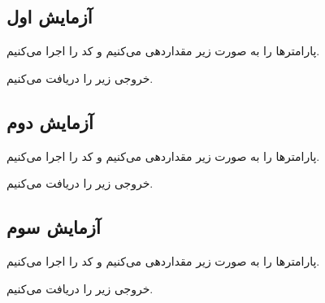 \documentclass[a4paper, 12pt]{article}
\theoremstyle{definition}
\begin{document}
\subsection{آزمایش اول}
پارامترها را به صورت زیر مقداردهی می‌کنیم و کد را اجرا می‌کنیم.

\LTR

\RTL

خروجی زیر را دریافت می‌کنیم.

\LTR

\RTL

\subsection{آزمایش دوم}
پارامترها را به صورت زیر مقداردهی می‌کنیم و کد را اجرا می‌کنیم.


\LTR

\RTL

خروجی زیر را دریافت می‌کنیم.

\LTR

\RTL

\subsection{آزمایش سوم}
پارامترها را به صورت زیر مقداردهی می‌کنیم و کد را اجرا می‌کنیم.


\LTR

\RTL

خروجی زیر را دریافت می‌کنیم.

\LTR

\RTL
\end{document}

